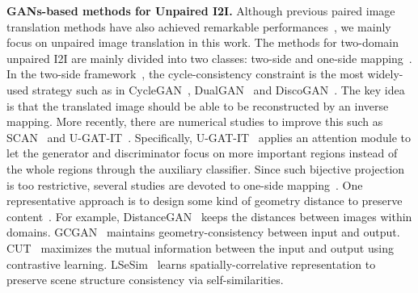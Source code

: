 \documentclass{article}
\begin{document}
\textbf{GANs-based methods for Unpaired I2I.}
Although previous paired image translation methods have also achieved remarkable performances~\cite{isola2017image,wang2018high,tang2019multi,park2019semantic,zhang2020cross,zhou2021cocosnet}, we mainly focus on unpaired image translation in this work. The methods for two-domain unpaired I2I are mainly divided into two classes: two-side and one-side mapping~\cite{pang2021image,zheng2021spatially}. In the two-side framework~\cite{zhu2017unpaired,yi2017dualgan,kim2017learning,liu2017unsupervised,li2018unsupervised,kim2019u,gokaslan2018improving,amodio2019travelgan,wu2019transgaga,zhao2020unpaired,katzir2020cross}, the cycle-consistency constraint is the most widely-used strategy such as in CycleGAN~\cite{zhu2017unpaired}, DualGAN~\cite{yi2017dualgan} and DiscoGAN~\cite{kim2017learning}. 
The key idea is that the translated image should be able to be reconstructed by an inverse mapping. More recently, there are numerical studies to improve this such as SCAN~\cite{li2018unsupervised} and U-GAT-IT~\cite{kim2019u}. Specifically, U-GAT-IT~\cite{kim2019u} applies an attention module to let the generator and discriminator focus on more important regions instead of the whole regions through the auxiliary classifier. Since such bijective projection is too restrictive, several studies are devoted to one-side mapping~\cite{park2020contrastive,benaim2017one,fu2019geometry,zhu2017unpaired,zheng2021spatially,park2020swapping,jiang2020tsit}. One representative approach is to design some kind of geometry distance to preserve content~\cite{pang2021image}. For example, DistanceGAN~\cite{benaim2017one} keeps the distances between images within domains. GCGAN~\cite{fu2019geometry} maintains geometry-consistency between input and output. CUT~\cite{park2020contrastive} maximizes the mutual information between the input and output using contrastive learning. LSeSim~\cite{zheng2021spatially} learns spatially-correlative representation to preserve scene structure consistency via self-similarities.
\end{document}
